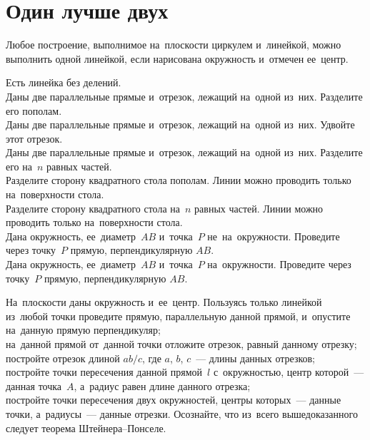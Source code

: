 

\section*{Один лучше двух}


Любое построение, выполнимое на~плоскости циркулем и~линейкой, можно выполнить
одной линейкой, если нарисована окружность и~отмечен ее~центр.

\begin{problems}

\item
Есть линейка без делений.
\\
\subproblem
Даны две параллельные прямые и~отрезок, лежащий на~одной из~них.
Разделите его пополам.
\\
\subproblem
Даны две параллельные прямые и~отрезок, лежащий на~одной из~них.
Удвойте этот отрезок.
\\
\subproblem
Даны две параллельные прямые и~отрезок, лежащий на~одной из~них.
Разделите его на~$n$ равных частей.
\\
\subproblem
Разделите сторону квадратного стола пополам.
Линии можно проводить только на~поверхности стола.
\\
\subproblem
Разделите сторону квадратного стола на~$n$ равных частей.
Линии можно проводить только на~поверхности стола.
\\
\subproblem
Дана окружность, ее~диаметр~$AB$ и~точка~$P$ не~на~окружности.
Проведите через точку~$P$ прямую, перпендикулярную $AB$.
\\
\subproblem
Дана окружность, ее~диаметр~$AB$ и~точка~$P$ на~окружности.
Проведите через точку~$P$ прямую, перпендикулярную $AB$.

\item
На~плоскости даны окружность и~ее~центр.
Пользуясь только линейкой
\\
\subproblem
из~любой точки проведите прямую, параллельную данной прямой, и~опустите
на~данную прямую перпендикуляр;
\\
\subproblem
на~данной прямой от~данной точки отложите отрезок, равный данному отрезку;
\\
\subproblem
постройте отрезок длиной $a b / c$, где $a$, $b$, $c$~--- длины данных отрезков;
\\
\subproblem
постройте точки пересечения данной прямой~$l$ с~окружностью, центр которой~---
данная точка~$A$, а~радиус равен длине данного отрезка;
\\
\subproblem
постройте точки пересечения двух окружностей, центры которых~--- данные точки,
а~радиусы~--- данные отрезки.
Осознайте, что из~всего вышедоказанного следует теорема Штейнера--Понселе.

\end{problems}

